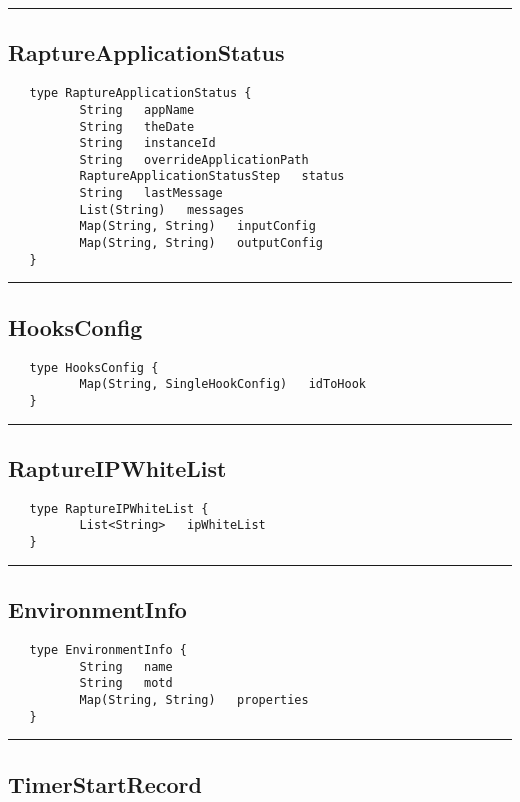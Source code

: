 \rule{15cm}{2pt}
\subsection{RaptureApplicationStatus}
\label{type:RaptureApplicationStatus}

\begin{verbatim}
   type RaptureApplicationStatus {
          String   appName
          String   theDate
          String   instanceId
          String   overrideApplicationPath
          RaptureApplicationStatusStep   status
          String   lastMessage
          List(String)   messages
          Map(String, String)   inputConfig
          Map(String, String)   outputConfig
   }
\end{verbatim}

\rule{15cm}{2pt}
\subsection{HooksConfig}
\label{type:HooksConfig}

\begin{verbatim}
   type HooksConfig {
          Map(String, SingleHookConfig)   idToHook
   }
\end{verbatim}

\rule{15cm}{2pt}
\subsection{RaptureIPWhiteList}
\label{type:RaptureIPWhiteList}

\begin{verbatim}
   type RaptureIPWhiteList {
          List<String>   ipWhiteList
   }
\end{verbatim}

\rule{15cm}{2pt}
\subsection{EnvironmentInfo}
\label{type:EnvironmentInfo}

\begin{verbatim}
   type EnvironmentInfo {
          String   name
          String   motd
          Map(String, String)   properties
   }
\end{verbatim}

\rule{15cm}{2pt}
\subsection{TimerStartRecord}
\label{type:TimerStartRecord}


